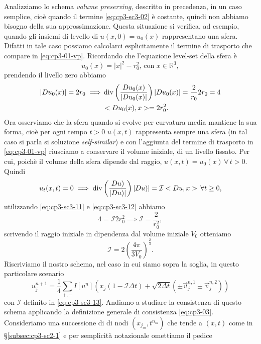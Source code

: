 Analizziamo lo schema \emph{volume preserving}, descritto in
precedenza, in un caso semplice, cioè quando il termine
\eqref{eq:cp3-sc3-02} è costante, quindi non abbiamo bisogno
della sua approssimazione. Questa situazione si verifica, ad esempio, quando gli
insiemi di levello di $u(x,0)=u_0(x)$ rappresentano una sfera. Difatti
in tale caso possiamo calcolarci esplicitamente il termine di
trasporto che compare in \eqref{eq:cp3-01-vp}. Ricordando che
l'equazione level-set della sfera è
\begin{equation}
\label{eq:cp3-sc3-10}
u_0(x)=|x|^2-r_0^2\text{, con $x\in\mathbb{R}^3$},
\end{equation}  
prendendo il livello zero abbiamo
\begin{align}
\label{eq:cp3-sc3-11}
|Du_0(x)|=2r_0\implies&\operatorname{div}\left(\frac{Du_0(x)}{|Du_0(x)|}\right)|Du_0(x)|=\frac{2}{r_0}2r_0=4 \\
\label{eq:cp3-sc3-12}
&<Du_0(x),x>=2r_0^2.
\end{align}
Ora osserviamo che la sfera quando si evolve per curvatura media
mantiene la sua forma, cioè per ogni tempo $t>0$ $u(x,t)$ rappresenta
sempre una sfera (in tal caso si parla si soluzione
\emph{self-similar}) e con l'aggiunta del termine di trasporto in
\eqref{eq:cp3-01-vp} riusciamo a conservare il volume iniziale, di un livello
fissato. Per cui, poichè il volume della sfera dipende dal raggio,
 $u(x,t)=u_0(x)\,\forall\,t>0$. Quindi
\[
u_t(x,t)=0\implies\operatorname{div}\left(\frac{Du)}{|Du)|}\right)|Du)|=\mathcal{I}<Du,x>\,
\forall t\geq 0,
\]
utilizzando \eqref{eq:cp3-sc3-11} e \eqref{eq:cp3-sc3-12} abbiamo
\[
4=\mathcal{I}2r_0^2\implies\mathcal{I}=\frac{2}{r_0^2},
\]
scrivendo il raggio iniziale in dipendenza dal volume iniziale $V_0$
otteniamo
\begin{equation}
\label{eq:cp3-sc3-13}
\mathcal{I}=2\left(\frac{4\pi}{3V_0}\right)^{\frac{2}{3}}.
\end{equation}
Riscriviamo il nostro schema, nel caso in cui siamo sopra la soglia,
in questo particolare scenario
\begin{equation}
\label{eq:cp3-sc3-14}
u_j^{n+1}=\frac{1}{4}\sum_{+,-}I[u^n]\left(x_j(1-\mathcal{I}\Delta
  t)+ \sqrt{2\Delta t}(\pm\vec{v}_j^{n,1}\pm\vec{v}_j^{n,2})\right)
\end{equation}
con $\mathcal{I}$ definito in \eqref{eq:cp3-sc3-13}. Andiamo a
studiare la consistenza di questo schema applicando la definizione
generale di consistenza \eqref{eq:cp3-03}. Consideriamo una
successione di di nodi $(x_{j_m},t^{n_m})$ che tende a $(x,t)$ come in
§\ref{subsec:cp3-sc2-1} e per semplicità notazionale omettiamo il pedice
